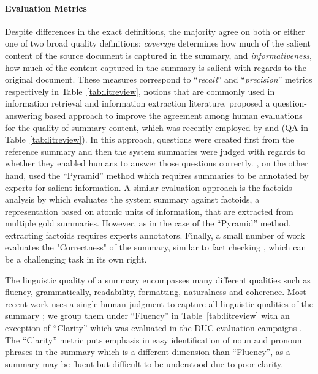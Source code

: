 \documentclass[11pt,a4paper]{article}
\begin{document}
\paragraph{Evaluation Metrics}
Despite differences in the exact definitions,
the majority \citep[e.g.,][]{Hsu2018,Celikyilmaz2018,narayan18xsum,Chen2018a,Peyrard2018a} agree on both or either one of two broad quality definitions: {\em coverage} determines how much of the salient content of the source document is captured in the summary, and {\em informativeness}, how much of the content captured in the summary is salient with regards to the original document. These measures correspond to ``\textit{recall}'' and ``\textit{precision}'' metrics respectively in Table~\ref{tab:litreview}, notions that are commonly used in information retrieval and information extraction literature. \citet{Clarke2010} proposed a question-answering based approach to improve the agreement among human evaluations for the quality of summary content, which was recently employed by \citet{narayan18xsum} and \citet{Narayan2018} (QA in Table~\ref{tab:litreview}). In this approach,  questions were created first from the reference summary and then the system summaries were judged with regards to whether they enabled humans to answer those questions correctly. \citet{ShafieiBavani2018}, on the other hand, used the ``Pyramid'' method \citep{Nenkova2004a} which requires summaries to be annotated by experts for salient information. 
A similar evaluation approach is the factoids analysis by  \citet{teufel2004evaluating} which evaluates the system summary against factoids, a representation based on atomic units of information, that are extracted from multiple gold summaries. However, as in the case of the ``Pyramid'' method, extracting factoids  %
requires experts annotators. 
Finally, a small number of work evaluates the "Correctness" \citep{Chen2018a,Li2018a,Chen2018a} of the summary, similar to fact checking \cite{vlachos-riedel:2014:W14-25}, which can be a challenging task in its own right.



The linguistic quality of a summary encompasses many different qualities such as fluency, grammatically, readability, formatting, naturalness and coherence. Most recent work uses 
a single human judgment
to capture all linguistic qualities of the summary \cite{Hsu2018,Kryscinski2018,narayan18xsum,Song2018,Guo2018a}; we group them under ``Fluency'' in Table~\ref{tab:litreview} with an exception of ``Clarity'' which was evaluated in the DUC evaluation campaigns \citep{dang2005overview}. The ``Clarity'' metric puts emphasis in easy identification of noun and pronoun phrases in the summary which is a different dimension than ``Fluency'', as a summary may be fluent but difficult to be understood due to poor clarity.
\end{document}
